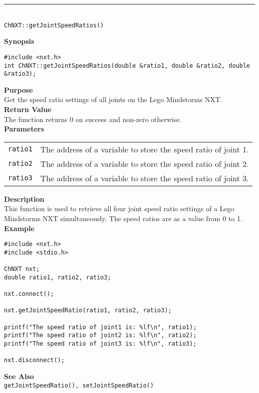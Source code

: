 \noindent
\vspace{5pt}
\rule{4.5in}{0.015in}\\
\noindent
{\LARGE \texttt{ChNXT::getJointSpeedRatios()}}\\
{}

\noindent
{\bf Synopsis}
\vspace{-8pt}
\begin{verbatim}
#include <nxt.h>
int ChNXT::getJointSpeedRatios(double &ratio1, double &ratio2, double &ratio3);
\end{verbatim}

\noindent
{\bf Purpose}\\
Get the speed ratio settings of all joints on the Lego Mindstorms NXT.\\

\noindent
{\bf Return Value}\\
The function returns 0 on success and non-zero otherwise.\\

\noindent
{\bf Parameters}
\vspace{-0.1in}
\begin{description}
\item               
\begin{tabular}{p{10 mm}p{145 mm}}
\texttt{ratio1} & The address of a variable to store the speed ratio of joint 1.\\
\texttt{ratio2} & The address of a variable to store the speed ratio of joint 2.\\
\texttt{ratio3} & The address of a variable to store the speed ratio of joint 3.\\
\end{tabular}
\end{description}

\noindent
{\bf Description}\\
This function is used to retrieve all four joint speed ratio settings of a Lego
Mindstorms NXT simultaneously. The speed ratios are as a value from 0 to 1. \\

\noindent
{\bf Example}\\
\begin{verbatim}
#include <nxt.h>
#include <stdio.h>

ChNXT nxt;
double ratio1, ratio2, ratio3;

nxt.connect();

nxt.getJointSpeedRatio(ratio1, ratio2, ratio3);

printf("The speed ratio of joint1 is: %lf\n", ratio1);
printf("The speed ratio of joint2 is: %lf\n", ratio2);
printf("The speed ratio of joint3 is: %lf\n", ratio3);

nxt.disconnect();
\end{verbatim}

\noindent
{\bf See Also}\\
\texttt{getJointSpeedRatio(), setJointSpeedRatio()}


